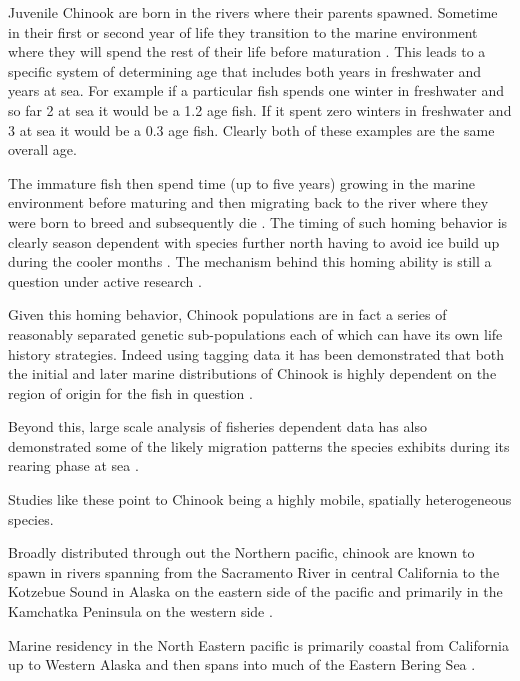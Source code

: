 \documentclass[11pt]{article}
\begin{document}
Juvenile Chinook are born in the rivers where their parents spawned. Sometime in their first or second year of life they transition to the marine environment where they will spend the rest of their life before maturation \cite{oceanchinook}. This leads to a specific system of determining age that includes both years in freshwater and years at sea. For example if a particular fish spends one winter in freshwater and so far 2 at sea it would be a 1.2 age fish. If it spent zero winters in freshwater and 3 at sea it would be a 0.3 age fish. Clearly both of these examples are the same overall age.

The immature fish then spend time (up to five years) growing in the marine environment before maturing and then migrating back to the river where they were born to breed and subsequently die \cite{oceanchinook}. The timing of such homing behavior is clearly season dependent with species further north having to avoid ice build up during the cooler months \cite{oceanchinook}. The mechanism behind this homing ability is still a question under active research \cite{bracis2012}. \newline

Given this homing behavior, Chinook populations are in fact a series of reasonably separated genetic sub-populations each of which can have its own life history strategies. Indeed using tagging data it has been demonstrated that both the initial and later marine distributions of Chinook is highly dependent on the region of origin for the fish in question \cite{shelton2019} \cite{tucker2019}. 

Beyond this, large scale analysis of fisheries dependent data has also demonstrated some of the likely migration patterns the species exhibits during its rearing phase at sea \cite{langan2024}. 

Studies like these point to Chinook being a highly mobile, spatially heterogeneous species.\newline

Broadly distributed through out the Northern pacific, chinook are known to spawn in rivers spanning from the Sacramento River in central California to the Kotzebue Sound in Alaska on the eastern side of the pacific and primarily in the Kamchatka Peninsula on the western side \cite{oceanchinook}. 

Marine residency in the North Eastern pacific is primarily coastal from California up to Western Alaska and then spans into much of the Eastern Bering Sea \cite{oceanchinook} \cite{langan2024}. \newline
\end{document}
